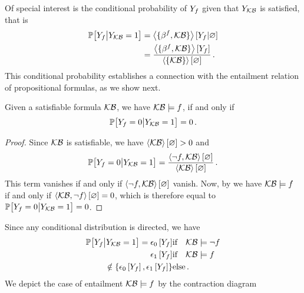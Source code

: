 % 
Of special interest is the conditional probability of $Y_{f}$ given that $Y_{\mathcal{KB}}$ is satisfied, that is
\begin{align*}
    \mathbb{P}\big[Y_{f}\big|Y_{\mathcal{KB}}=1\big]
    & = \left\langle \{\beta^{f} ,\mathcal{KB}\}\right\rangle \left[ Y_{f} | \varnothing \right]\\
    & = \frac{\left\langle \{\beta^{f},\mathcal{KB}\}\right\rangle \left[ Y_{f} \right]}{\left\langle \{\mathcal{KB}\}\right\rangle \left[ \varnothing \right]} \, .
\end{align*}
This conditional probability establishes a connection with the entailment relation of propositional formulas, as we show next.

%
\begin{theorem}
    \label{the:probEntailment}
    Given a satisfiable formula $\mathcal{KB}$, we have $\mathcal{KB}\models f$, if and only if
    \begin{align*}
        \mathbb{P}\big[Y_{f}=0\big|Y_{\mathcal{KB}}=1\big] = 0 \, .
    \end{align*}
\end{theorem}
\begin{proof}
    Since $\mathcal{KB}$ is satisfiable, we have $\left\langle \mathcal{KB}\right\rangle \left[ \varnothing \right]>0$ and
    \[ \mathbb{P}\big[Y_{f}=0\big|Y_{\mathcal{KB}}=1\big] = \frac{\left\langle \lnot f,\mathcal{KB}\right\rangle \left[ \varnothing \right]}{\left\langle \mathcal{KB}\right\rangle \left[ \varnothing \right]} \, .  \]
    This term vanishes if and only if $\left\langle \lnot f,\mathcal{KB}\right\rangle \left[ \varnothing \right]$ vanish.
    Now, by  we have $\mathcal{KB}\models f$ if and only if $\left\langle \mathcal{KB},\lnot f\right\rangle \left[ \varnothing \right]=0$, which is therefore equal to $\mathbb{P}\big[Y_{f}=0\big|Y_{\mathcal{KB}}=1\big]=0$.
\end{proof}

Since any conditional distribution is directed, we have
\begin{align}
    \condprobof{\formulavar}{\kbvar=1} = %
    \fbasisat{\formulavar}  & \ifspace \kb\models\lnot\exformula \\
    \tbasisat{\formulavar}  & \ifspace \kb\models\exformula \\
    \notin \{\fbasisat{\formulavar},\tbasisat{\formulavar}\} & \text{else}
    \, .
\end{align}
We depict the case of entailment $\mathcal{KB}\models f$ by the contraction diagram
\begin{center}
    
\end{center}

